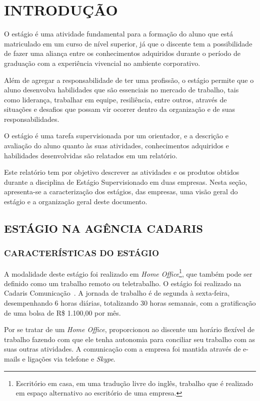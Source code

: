 \documentclass[
  12pt,            %
  openany,
  oneside,
  a4paper,         %
  english,      %
  brazil
]{article}
\numberwithin{figure}{section}
\numberwithin{table}{section}
\begin{document}

\section{INTRODUÇÃO}

O estágio é uma atividade fundamental para a formação do aluno que está matriculado em um curso de nível superior, já que o discente tem a possibilidade de fazer uma aliança entre os conhecimentos adquiridos durante o período de graduação com a experiência vivencial no ambiente corporativo.

Além de agregar a responsabilidade de ter uma profissão, o estágio permite que o aluno desenvolva habilidades que são essenciais no mercado de trabalho, tais como liderança, trabalhar em equipe, resiliência, entre outros, através de situações e desafios que possam vir ocorrer dentro da organização e de suas responsabilidades.

O estágio é uma tarefa supervisionada por um orientador, e a descrição e avaliação do aluno quanto às suas atividades, conhecimentos adquiridos e habilidades desenvolvidas são relatados em um relatório.

Este relatório tem por objetivo descrever as atividades e os produtos obtidos durante a disciplina de Estágio Supervisionado em duas empresas. Nesta seção, apresenta-se a caracterização dos estágios, das empresas, uma visão geral do estágio e a organização geral deste documento.


\subsection{ESTÁGIO NA AGÊNCIA CADARIS}

\subsubsection{CARACTERÍSTICAS DO ESTÁGIO}

A modalidade deste estágio foi realizado em \textit{Home Office}\footnote{Escritório em casa, em uma tradução livre do inglês, trabalho que é realizado em espaço alternativo ao escritório de uma empresa.}, que também pode ser definido como um trabalho remoto ou teletrabalho. O estágio foi realizado na Cadaris Comunicação~\cite{cadaris}. A jornada de trabalho é de segunda à sexta-feira, desempenhando 6 horas diárias, totalizando 30 horas semanais, com a gratificação de uma bolsa de R\$ 1.100,00 por mês.

Por se tratar de um \textit{Home Office}, proporcionou ao discente um horário flexível de trabalho fazendo com que ele tenha autonomia para conciliar seu trabalho com as suas outras atividades. A comunicação com a empresa foi mantida através de e-mails e ligações via telefone e \textit{Skype}.
\end{document}
